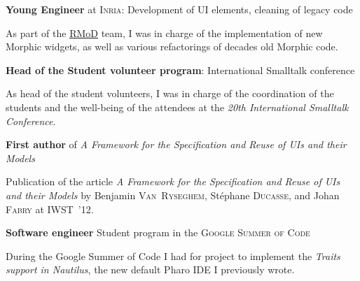 \begin{rubric}{%
}

\entry*[March 2013] \textbf{Young Engineer} at \textsc{Inria}: Development of UI
elements, cleaning of legacy code

\mbox{}

As part of the \href{http://rmod.inria.fr/}{\underline{RMoD}} team, I was in
charge of the implementation of new Morphic widgets, as well as various
refactorings of decades old Morphic code.


\entry*[August 2012] \textbf{Head of the Student volunteer program}:
International Smalltalk conference

\mbox{}

As head of the student volunteers, I was in charge of the coordination of the
students and the well-being of the attendees at the \emph{20th International
  Smalltalk Conference}.


\entry*[August 2012] \textbf{First author} of \emph{A Framework for the Specification and Reuse of UIs and their Models}

\mbox{}

Publication of the article \emph{A Framework for the Specification and Reuse of UIs and their Models} by Benjamin \textsc{Van~Ryseghem}, Stéphane \textsc{Ducasse}, and Johan \textsc{Fabry} at IWST~'12.

 \textbf{Software engineer} Student program in the \textsc{Google Summer of Code}

\mbox{}

During the Google Summer of Code I had for project to implement the \emph{Traits support in Nautilus},
the new default Pharo IDE I previously wrote.


\end{rubric}

